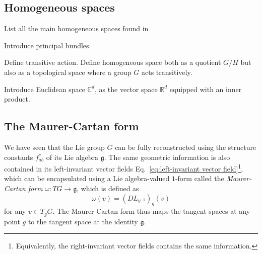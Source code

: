 


\subsection{Homogeneous spaces}

List all the main homogeneous spaces found in

Introduce principal bundles.

Define transitive action. Define homogeneous space both as a quotient $G/H$ but also as a topological space where a group $G$ acts transitively.

Introduce Euclidean space $\mathbb{E}^d$, as the vector space $\mathbb{R}^d$ equipped with an inner product.

\subsection{The Maurer-Cartan form} \label{sec:The Maurer-Cartan form}

We have seen that the Lie group $G$ can be fully reconstructed using the structure constants $f_{ab}^c$ of its Lie algebra $\mathfrak{g}$. The same geometric information is also contained in its left-invariant vector fields Eq.~\ref{eq:left-invariant vector field}\footnote{Equivalently, the right-invariant vector fields contains the same information.}, which can be encapsulated using a Lie algebra-valued $1$-form called the \textit{Maurer-Cartan form} $\omega : TG \to \mathfrak{g}$, which is defined as
\begin{equation} \label{eq:Maurer-Cartan form}
\omega(v) = (DL_{g^{-1}})_g (v)
\end{equation}
for any $v \in T_g G$. The Maurer-Cartan form thus maps the tangent spaces at any point $g$ to the tangent space at the identity $\mathfrak{g}$.

